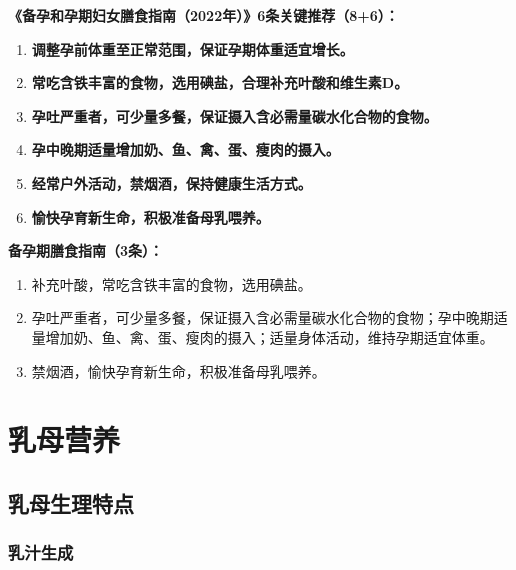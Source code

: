 \begin{keybox}
\textbf{《备孕和孕期妇女膳食指南（2022年）》6条关键推荐（8+6）：}
\begin{enumerate}[leftmargin=*]
    \item \textbf{调整孕前体重至正常范围，保证孕期体重适宜增长。}
    \item \textbf{常吃含铁丰富的食物，选用碘盐，合理补充叶酸和维生素D。}
    \item \textbf{孕吐严重者，可少量多餐，保证摄入含必需量碳水化合物的食物。}
    \item \textbf{孕中晚期适量增加奶、鱼、禽、蛋、瘦肉的摄入。}
    \item \textbf{经常户外活动，禁烟酒，保持健康生活方式。}
    \item \textbf{愉快孕育新生命，积极准备母乳喂养。}
\end{enumerate}

\textbf{备孕期膳食指南（3条）：}
\begin{enumerate}[leftmargin=*]
    \item 补充叶酸，常吃含铁丰富的食物，选用碘盐。
    \item 孕吐严重者，可少量多餐，保证摄入含必需量碳水化合物的食物；孕中晚期适量增加奶、鱼、禽、蛋、瘦肉的摄入；适量身体活动，维持孕期适宜体重。
    \item 禁烟酒，愉快孕育新生命，积极准备母乳喂养。
\end{enumerate}
\end{keybox}

\section{乳母营养}

\subsection{乳母生理特点}

\subsubsection{乳汁生成}


